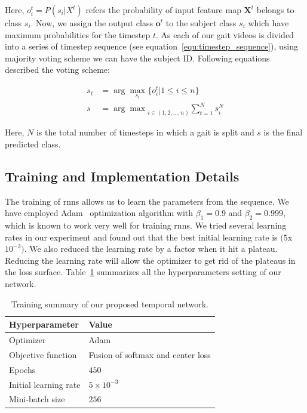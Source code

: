 Here, $o_i^t = P(s_i | X^t)$ refers the probability of input feature map $\boldsymbol X^t$ belongs to class $s_i$. Now, we assign the output class $\mathbf{o}^t$ to the subject class $s_i$ which have maximum probabilities for the timestep $t$. As each of our gait videos is divided into a series of timestep sequence (see equation~\ref{equ:timestep_sequence}), using majority voting scheme we can have the subject ID. Following equations described the voting scheme:

\begin{equation}
\label{equ:predicted_class}
\begin{split}
s_t &=  \arg\max_{s_i}{\{o_i^t | 1 \leq i \leq n\}} \\
s &= {\arg\max}_{i\in(1, 2, ...,n)}{\sum_{t=1}^{N}s_i^N}
\end{split}
\end{equation}

Here, $ N $ is the total number of timesteps in which a gait is split and $ s $ is the final predicted class.  


\subsection{Training and Implementation Details}
The training of \gls{rnn}s allows us to learn the parameters from the sequence. We have employed Adam~\cite{Kingma_15} optimization algorithm with $\beta_1 = 0.9$ and $\beta_2 = 0.999$, which is known to work very well for training \gls{rnn}s. We tried several learning rates in our experiment and found out that the best initial learning rate is $(5$x$10^{-3})$. We also reduced the learning rate by a factor when it hit a plateau. Reducing the learning rate will allow the optimizer to get rid of the plateaus in the loss surface. Table~\ref{table:summary_tn} summarizes all the hyperparameters setting of our network.

\begin{table}
	\centering
	\caption{Training summary of our proposed temporal network. \label{table:summary_tn}}
	\begin{tabular*}{32pc}{@{\extracolsep{\fill}}ll@{}}
		\hline \noalign{\vspace{3pt}}
		\textbf{Hyperparameter} &\qquad \textbf{Value} \\ [3pt] \hline\noalign{\vspace{3pt}}
		Optimizer     			&\qquad Adam~\cite{Kingma_15} \\[3pt]
		Objective function  	&\qquad Fusion of softmax and center loss \\[3pt]
		Epochs        			&\qquad $ 450 $ \\ [3pt]
		Initial learning rate	&\qquad $5 \times 10^{-3}$  \\[3pt]
		Mini-batch size			&\qquad $ 256 $ \\
		\hline
	\end{tabular*}
\end{table}


